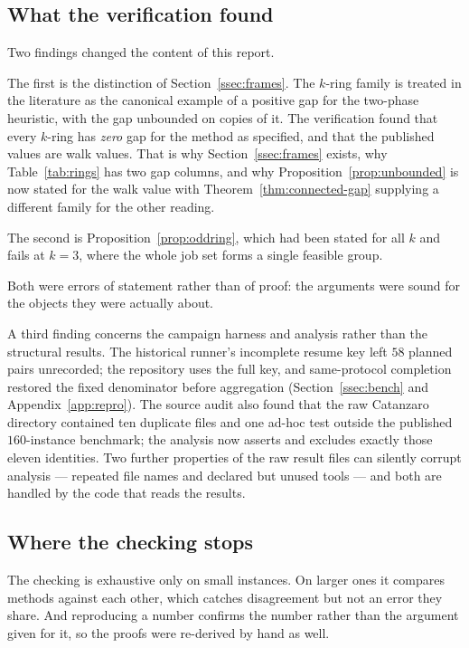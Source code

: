 \subsection{What the verification found}\label{ssec:verify-found}

Two findings changed the content of this report.

The first is the distinction of Section~\ref{ssec:frames}. The $k$-ring family is
treated in the literature as the canonical example of a positive gap for the two-phase
heuristic, with the gap unbounded on copies of it. The verification found that every
$k$-ring has \emph{zero} gap for the method as specified, and that the published values
are walk values. That is why
Section~\ref{ssec:frames} exists, why Table~\ref{tab:rings} has two gap columns, and
why Proposition~\ref{prop:unbounded} is now stated for the walk value with
Theorem~\ref{thm:connected-gap} supplying a different family for the other
reading.

The second is Proposition~\ref{prop:oddring}, which had been stated for all $k$ and
fails at $k=3$, where the whole job set forms a single feasible group.

Both were errors of statement rather than of proof: the arguments were sound for the
objects they were actually about.

A third finding concerns the campaign harness and analysis rather than the structural
results. The historical runner's incomplete resume key left $58$ planned pairs
unrecorded; the repository uses the full key, and same-protocol completion restored the
fixed denominator before aggregation (Section~\ref{ssec:bench} and
Appendix~\ref{app:repro}). The source audit also found that
the raw Catanzaro directory contained ten duplicate files and one ad-hoc test outside
the published $160$-instance benchmark; the analysis now asserts and excludes exactly
those eleven identities. Two further properties of the raw result files can silently
corrupt analysis --- repeated file names and declared but unused tools --- and both are
handled by the code that reads the results.

\subsection{Where the checking stops}\label{ssec:verify-limits}

The checking is exhaustive only on small instances. On larger ones it compares methods
against each other, which catches disagreement but not an error they share. And
reproducing a number confirms the number rather than the argument given for it, so the
proofs were re-derived by hand as well.

